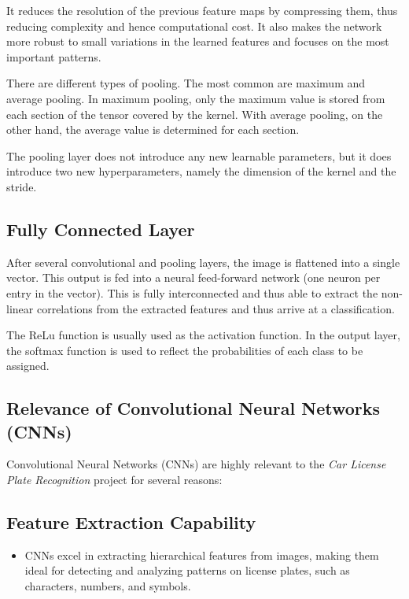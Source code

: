 It reduces the resolution of the previous feature maps by compressing them, thus reducing complexity and hence computational cost. It also makes the network more robust to small variations in the learned features and focuses on the most important patterns. \cite{Namatevs:2017}


There are different types of pooling. The most common are maximum and average pooling. In maximum pooling, only the maximum value is stored from each section of the tensor covered by the kernel. With average pooling, on the other hand, the average value is determined for each section. \cite{Saha:2018}

The pooling layer does not introduce any new learnable parameters, but it does introduce two new hyperparameters, namely the dimension of the kernel and the stride. \cite{Michelucci:2019}

\subsection{Fully Connected Layer}

After several convolutional and pooling layers, the image is flattened into a single vector. This output is fed into a neural feed-forward network (one neuron per entry in the vector). This is fully interconnected and thus able to extract the non-linear correlations from the extracted features and thus arrive at a classification.\cite{Saha:2018}

The ReLu function is usually used as the activation function. In the output layer, the softmax function is used to reflect the probabilities of each class to be assigned. \cite{Arunava:2018}

\subsection{Relevance of Convolutional Neural Networks (CNNs)}

Convolutional Neural Networks (CNNs) are highly relevant to the \textit{Car License Plate Recognition} project for several reasons:

\subsection*{Feature Extraction Capability}
\begin{itemize}
	\item CNNs excel in extracting hierarchical features from images, making them ideal for detecting and analyzing patterns on license plates, such as characters, numbers, and symbols.
\end{itemize}

